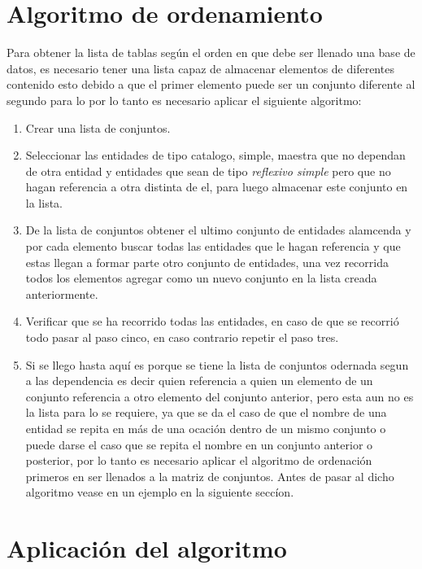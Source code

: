 \section{Algoritmo de ordenamiento}
\label{Algoritmo de ordenamiento}
Para obtener la lista de tablas seg\'un el orden en que debe ser llenado una base de datos,  es necesario tener una lista capaz de almacenar elementos de diferentes contenido esto debido a que el primer elemento puede ser un conjunto diferente al segundo para lo por lo tanto es necesario aplicar el siguiente algoritmo:
\begin{enumerate}
\item Crear una lista de conjuntos.
\item Seleccionar las entidades de tipo catalogo, simple, maestra que no dependan de otra entidad y entidades que sean de tipo \textit{reflexivo simple} pero que no hagan referencia a otra distinta de el, para luego almacenar este conjunto en la lista.
\item De la lista de conjuntos obtener el ultimo conjunto de entidades alamcenda y por cada elemento buscar todas las entidades que le hagan referencia y que estas llegan a formar parte otro conjunto de entidades, una vez recorrida todos los elementos agregar como un nuevo conjunto en la lista creada anteriormente.
\item Verificar que se ha recorrido todas las entidades, en caso de que se recorri\'o todo pasar al paso cinco, en caso contrario repetir el paso tres.
\item Si se llego hasta aqu\'i es porque se tiene la lista de conjuntos odernada segun a las dependencia es decir quien referencia a quien un elemento de un conjunto referencia a otro elemento del conjunto anterior, pero esta aun no es la lista para lo se requiere, ya que se da el caso de que el nombre de una entidad se repita en m\'as de una ocaci\'on dentro de un mismo conjunto o puede darse el caso que se repita el nombre en un conjunto anterior o posterior, por lo tanto es necesario aplicar el algoritmo de ordenaci\'on primeros en ser llenados a la matriz de conjuntos. Antes de pasar al dicho algoritmo vease en un ejemplo en la siguiente secc\'ion.
\end{enumerate}
\section{Aplicaci\'on del algoritmo}

